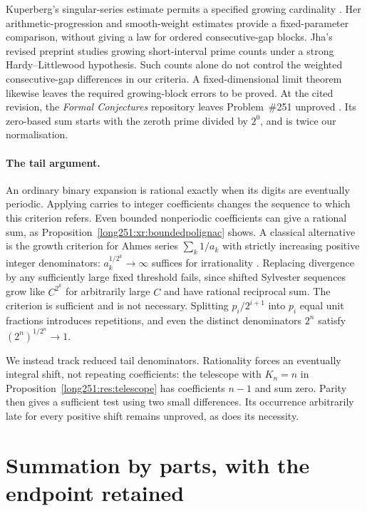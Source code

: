 \documentclass[11pt]{article}
\begin{document}
Kuperberg's singular-series estimate permits a specified growing
cardinality \cite[Theorem~1.1]{kuperberg2023}.
Her arithmetic-progression and smooth-weight estimates
\cite{kuperbergweighted2025} provide a fixed-parameter comparison, without
giving a law for ordered consecutive-gap blocks.
Jha's revised preprint \cite{jha2026} studies growing short-interval
prime counts under a strong Hardy--Littlewood hypothesis.  Such counts
alone do not control the weighted consecutive-gap differences in our
criteria.  A fixed-dimensional limit theorem likewise leaves the required
growing-block errors to be proved.
At the cited revision, the \emph{Formal Conjectures} repository leaves
Problem~\#251 unproved \cite{formalconjectures251}.
Its zero-based sum starts with the zeroth prime divided by $2^0$,
and is twice our normalisation.

\paragraph{The tail argument.}
An ordinary binary expansion is rational exactly when its digits are
eventually periodic.  Applying carries to integer coefficients changes
the sequence to which this criterion refers.  Even bounded nonperiodic
coefficients can give a rational sum, as
Proposition~\ref{long251:xr:boundedpolignac} shows.
A classical alternative is the growth criterion for Ahmes series
$\sum_k1/a_k$ with strictly increasing positive integer denominators:
$a_k^{1/2^k}\to\infty$ suffices for irrationality
\cite{erdosstraus1963}\cite[\S1]{kovactao2024}.
Replacing divergence by any sufficiently large fixed threshold fails,
since shifted Sylvester sequences grow like $C^{2^k}$ for arbitrarily
large $C$ and have rational reciprocal sum.  The criterion is sufficient
and is not necessary.  Splitting $p_i/2^{i+1}$ into $p_i$ equal unit
fractions introduces repetitions, and even the distinct denominators
$2^n$ satisfy $(2^n)^{1/2^n}\to1$.

We instead track reduced tail denominators.  Rationality forces an
eventually integral shift, not repeating coefficients: the telescope
with $K_n=n$ in Proposition~\ref{long251:res:telescope} has coefficients
$n-1$ and sum zero.  Parity then gives a sufficient test using two small
differences.  Its occurrence arbitrarily late for every positive shift
remains unproved, as does its necessity.

\section{Summation by parts, with the endpoint retained}\label{long251:sec:parts}
\end{document}
